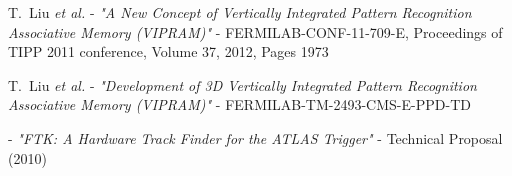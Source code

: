 \documentclass{cmspaper}
\begin{document}
\begin{thebibliography}{99}
 T.~Liu {\it et al.} - {\it "A New Concept of Vertically Integrated Pattern Recognition Associative Memory (VIPRAM)"} - FERMILAB-CONF-11-709-E, Proceedings of TIPP 2011 conference, Volume 37, 2012, Pages 1973

 T.~Liu {\it et al.} - {\it "Development of 3D Vertically Integrated Pattern Recognition Associative Memory (VIPRAM)"} - FERMILAB-TM-2493-CMS-E-PPD-TD

  - {\it "FTK: A Hardware Track Finder for the ATLAS Trigger"} - Technical Proposal (2010)


\end{thebibliography}
\newpage
\appendix
%
%
%
%
\end{document}
